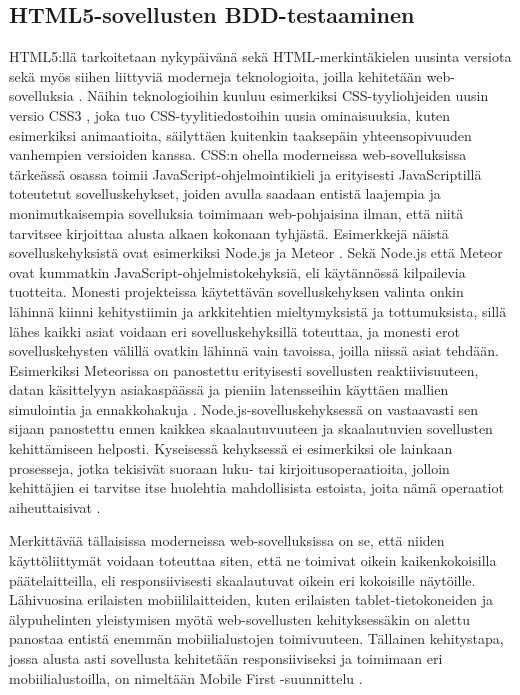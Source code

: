 \documentclass[finnish,nonumbib,nocopyright]{gradu2}
\begin{document}
\subsection{HTML5-sovellusten BDD-testaaminen}
\label{subsec:html5bdd}
HTML5:llä tarkoitetaan nykypäivänä sekä HTML-merkintäkielen uusinta versiota \cite{html5} sekä myös siihen liittyviä moderneja teknologioita, joilla kehitetään web-sovelluksia \cite{html5revolution}. Näihin teknologioihin kuuluu esimerkiksi CSS-tyyliohjeiden uusin versio CSS3 \cite{css3}, joka tuo CSS-tyylitiedostoihin uusia ominaisuuksia, kuten esimerkiksi animaatioita, säilyttäen kuitenkin taaksepäin yhteensopivuuden vanhempien versioiden kanssa. CSS:n ohella moderneissa web-sovelluksissa tärkeässä osassa toimii JavaScript-ohjelmointikieli \cite{html5revolution} ja erityisesti JavaScriptillä toteutetut sovelluskehykset, joiden avulla saadaan entistä laajempia ja monimutkaisempia sovelluksia toimimaan web-pohjaisina ilman, että niitä tarvitsee kirjoittaa alusta alkaen kokonaan tyhjästä. Esimerkkejä näistä sovelluskehyksistä ovat esimerkiksi Node.js \cite{nodejs} ja Meteor \cite{meteor}. Sekä Node.js että Meteor ovat kummatkin JavaScript-ohjelmistokehyksiä, eli käytännössä kilpailevia tuotteita. Monesti projekteissa käytettävän sovelluskehyksen valinta onkin lähinnä kiinni kehitystiimin ja arkkitehtien mieltymyksistä ja tottumuksista, sillä lähes kaikki asiat voidaan eri sovelluskehyksillä toteuttaa, ja monesti erot sovelluskehysten välillä ovatkin lähinnä vain tavoissa, joilla niissä asiat tehdään. Esimerkiksi Meteorissa on panostettu erityisesti sovellusten reaktiivisuuteen, datan käsittelyyn asiakaspäässä ja pieniin latensseihin käyttäen mallien simulointia ja ennakkohakuja \cite{meteor}. Node.js-sovelluskehyksessä on vastaavasti sen sijaan panostettu ennen kaikkea skaalautuvuuteen ja skaalautuvien sovellusten kehittämiseen helposti. Kyseisessä kehyksessä ei esimerkiksi ole lainkaan prosesseja, jotka tekisivät suoraan luku- tai kirjoitusoperaatioita, jolloin kehittäjien ei tarvitse itse huolehtia mahdollisista estoista, joita nämä operaatiot aiheuttaisivat \cite{nodejs}.

Merkittävää tällaisissa moderneissa web-sovelluksissa on se, että niiden käyttöliittymät voidaan toteuttaa siten, että ne toimivat oikein kaikenkokoisilla päätelaitteilla, eli responsiivisesti skaalautuvat oikein eri kokoisille näytöille. Lähivuosina erilaisten mobiililaitteiden, kuten erilaisten tablet-tietokoneiden ja älypuhelinten yleistymisen myötä web-sovellusten kehityksessäkin on alettu panostaa entistä enemmän mobiilialustojen toimivuuteen. Tällainen kehitystapa, jossa alusta asti sovellusta kehitetään responsiiviseksi ja toimimaan eri mobiilialustoilla, on nimeltään Mobile First -suunnittelu \cite{mobilefirst}.
\end{document}
